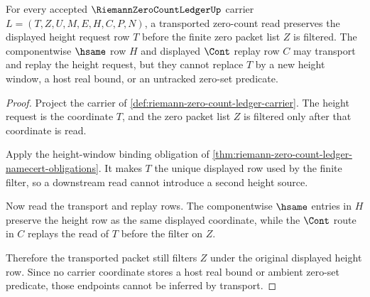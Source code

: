 \begin{theorem}
\label{thm:riemann-zero-count-ledger-height-filter-stability}
For every accepted $\RiemannZeroCountLedgerUp$ carrier $L=(T,Z,U,M,E,H,C,P,N)$, a transported zero-count read preserves the displayed height request row $T$ before the finite zero packet list $Z$ is filtered. The componentwise $\hsame$ row $H$ and displayed $\Cont$ replay row $C$ may transport and replay the height request, but they cannot replace $T$ by a new height window, a host real bound, or an untracked zero-set predicate.
\end{theorem}
\begin{proof}
Project the carrier of \autoref{def:riemann-zero-count-ledger-carrier}. The height request is the coordinate $T$, and the zero packet list $Z$ is filtered only after that coordinate is read.

Apply the height-window binding obligation of \autoref{thm:riemann-zero-count-ledger-namecert-obligations}. It makes $T$ the unique displayed row used by the finite filter, so a downstream read cannot introduce a second height source.

Now read the transport and replay rows. The componentwise $\hsame$ entries in $H$ preserve the height row as the same displayed coordinate, while the $\Cont$ route in $C$ replays the read of $T$ before the filter on $Z$.

Therefore the transported packet still filters $Z$ under the original displayed height row. Since no carrier coordinate stores a host real bound or ambient zero-set predicate, those endpoints cannot be inferred by transport.
\end{proof}

